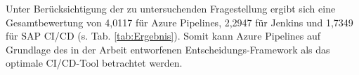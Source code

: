 \vspace*{-15mm}
Unter Berücksichtigung der zu untersuchenden Fragestellung ergibt sich eine Gesamtbewertung von 4,0117 für Azure Pipelines, 2,2947 für Jenkins und 1,7349 für SAP CI/CD (s. Tab. \ref{tab:Ergebnis}). Somit kann Azure Pipelines auf Grundlage des in der Arbeit entworfenen Entscheidungs-Framework als das optimale CI/CD-Tool betrachtet werden.  

